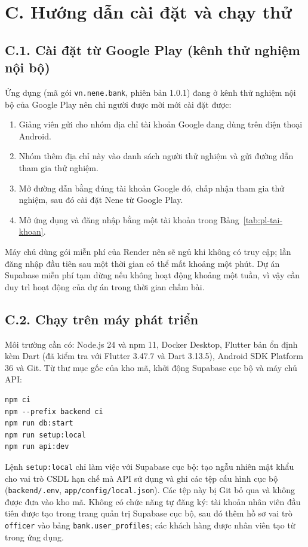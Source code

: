 \section*{C. Hướng dẫn cài đặt và chạy thử}
{}

\subsection*{C.1. Cài đặt từ Google Play (kênh thử nghiệm nội bộ)}

Ứng dụng (mã gói \texttt{vn.\allowbreak{}nene.\allowbreak{}bank}, phiên bản 1.0.1) đang ở kênh thử nghiệm nội bộ của Google Play nên chỉ người được mời mới cài đặt được:
\begin{enumerate}
	\item Giảng viên gửi cho nhóm địa chỉ tài khoản Google đang dùng trên điện thoại Android.
	\item Nhóm thêm địa chỉ này vào danh sách người thử nghiệm và gửi đường dẫn tham gia thử nghiệm.
	\item Mở đường dẫn bằng đúng tài khoản Google đó, chấp nhận tham gia thử nghiệm, sau đó cài đặt Nene từ Google Play.
	\item Mở ứng dụng và đăng nhập bằng một tài khoản trong Bảng~\ref{tab:pl-tai-khoan}.
\end{enumerate}

Máy chủ dùng gói miễn phí của Render nên sẽ ngủ khi không có truy cập; lần đăng nhập đầu tiên sau một thời gian có thể mất khoảng một phút. Dự án Supabase miễn phí tạm dừng nếu không hoạt động khoảng một tuần, vì vậy cần duy trì hoạt động của dự án trong thời gian chấm bài.

\subsection*{C.2. Chạy trên máy phát triển}

Môi trường cần có: Node.js 24 và npm 11, Docker Desktop, Flutter bản ổn định kèm Dart (đã kiểm tra với Flutter 3.47.7 và Dart 3.13.5), Android SDK Platform 36 và Git. Từ thư mục gốc của kho mã, khởi động Supabase cục bộ và máy chủ API:
\begin{lstlisting}
npm ci
npm --prefix backend ci
npm run db:start
npm run setup:local
npm run api:dev
\end{lstlisting}

Lệnh \texttt{setup:local} chỉ làm việc với Supabase cục bộ: tạo ngẫu nhiên mật khẩu cho vai trò CSDL hạn chế mà API sử dụng và ghi các tệp cấu hình cục bộ (\texttt{backend/\allowbreak{}.\allowbreak{}env}, \texttt{app/\allowbreak{}config/\allowbreak{}local.\allowbreak{}json}). Các tệp này bị Git bỏ qua và không được đưa vào kho mã. Không có chức năng tự đăng ký: tài khoản nhân viên đầu tiên được tạo trong trang quản trị Supabase cục bộ, sau đó thêm hồ sơ vai trò \texttt{officer} vào bảng \texttt{bank.\allowbreak{}user\_\allowbreak{}profiles}; các khách hàng được nhân viên tạo từ trong ứng dụng.

